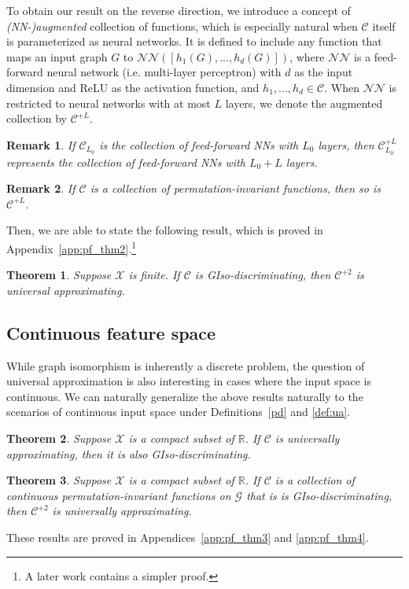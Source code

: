 \documentclass{article}
\newtheorem{theorem}{Theorem}
\newtheorem{remark}{Remark}
\def\Gfun{\mathcal{G}}
\begin{document}
To obtain our result on the reverse direction, we introduce a concept of \emph{(NN-)augmented} collection of functions, which is especially natural when $\mathcal{C}$ itself is parameterized as neural networks.
It is defined to include any function that maps an input graph $G$ to $\mathcal{NN}([h_1(G), ..., h_d(G)])$, where $\mathcal{NN}$ is a feed-forward neural network (i.e. multi-layer perceptron) with $d$ as the input dimension and ReLU as the activation function, and $h_1, ..., h_d \in \mathcal{C}$. When $\mathcal{NN}$ is restricted to neural networks with at most $L$ layers, we denote the augmented collection by $\mathcal{C}^{+L}$. 

\begin{remark}
If $\mathcal{C}_{L_0}$ is the collection of feed-forward NNs with $L_0$ layers, then $\mathcal{C}_{L_0}^{+L}$ represents the collection of feed-forward NNs with $L_0 + L$ layers.
\end{remark}

\begin{remark}
If $\mathcal{C}$ is a collection of permutation-invariant functions, then so is $\mathcal{C}^{+L}$.
\end{remark}

Then, we are able to state the following result, which is proved in Appendix~\ref{app:pf_thm2}.\footnote{A later work \cite{chen2020can} contains a simpler proof.} 
\begin{theorem}
\label{PD2UAfin}
Suppose $\mathcal{X}$ is finite. If $\mathcal{C}$ is GIso-discriminating, then $\mathcal{C}^{+2}$ is universal approximating.
\end{theorem}

\subsection{Continuous feature space}
While graph isomorphism is inherently a discrete problem, 
the question of universal approximation is also interesting in cases where the input space is continuous.
We can naturally generalize the above results naturally to the scenarios of continuous input space under Definitions~\ref{pd} and \ref{def:ua}. 

\begin{theorem}\label{ua2pdinf}
Suppose $\mathcal{X}$ is a compact subset of $\mathbb{R}$. If $\mathcal{C}$ is universally approximating, then it is also GIso-discriminating.
\end{theorem}

\begin{theorem}
\label{thm:4}
Suppose $\mathcal{X}$ is a compact subset of $\mathbb{R}$. If $\mathcal{C}$ is a collection of continuous permutation-invariant functions on $\Gfun$ that is is GIso-discriminating, then $\mathcal{C}^{+2}$ is universally approximating.
\end{theorem}
These results are proved in Appendices~\ref{app:pf_thm3} and \ref{app:pf_thm4}.
\end{document}
